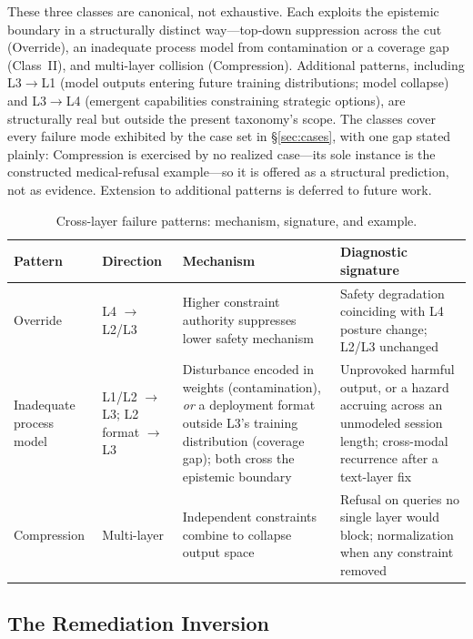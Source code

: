\documentclass[11pt]{article}
\begin{document}
These three classes are canonical, not exhaustive. Each exploits the epistemic boundary in a structurally distinct way---top-down suppression across the cut (Override), an inadequate process model from contamination or a coverage gap (Class~II), and multi-layer collision (Compression). Additional patterns, including L3$\to$L1 (model outputs entering future training distributions; model collapse) and L3$\to$L4 (emergent capabilities constraining strategic options), are structurally real but outside the present taxonomy's scope. The classes cover every failure mode exhibited by the case set in \S\ref{sec:cases}, with one gap stated plainly: Compression is exercised by no realized case---its sole instance is the constructed medical-refusal example---so it is offered as a structural prediction, not as evidence. Extension to additional patterns is deferred to future work.

\begin{table}[!htbp]
\centering
\small
\caption{Cross-layer failure patterns: mechanism, signature, and example.}
\label{tab:patterns}
{\setlength{\tabcolsep}{4pt}
\begin{tabularx}{\columnwidth}{@{}l l Y Y@{}}
\toprule
\textbf{Pattern} & \textbf{Direction} & \textbf{Mechanism} & \textbf{Diagnostic signature} \\
\midrule
Override & L4 $\to$ L2/L3 & Higher constraint authority suppresses lower safety mechanism & Safety degradation coinciding with L4 posture change; L2/L3 unchanged \\
Inadequate process model & L1/L2 $\to$ L3; L2 format $\to$ L3 & Disturbance encoded in weights (contamination), \emph{or} a deployment format outside L3's training distribution (coverage gap); both cross the epistemic boundary & Unprovoked harmful output, or a hazard accruing across an unmodeled session length; cross-modal recurrence after a text-layer fix \\
Compression & Multi-layer & Independent constraints combine to collapse output space & Refusal on queries no single layer would block; normalization when any constraint removed \\
\bottomrule
\end{tabularx}}
\end{table}

\subsection{The Remediation Inversion}\label{sec:remediation}
\end{document}
